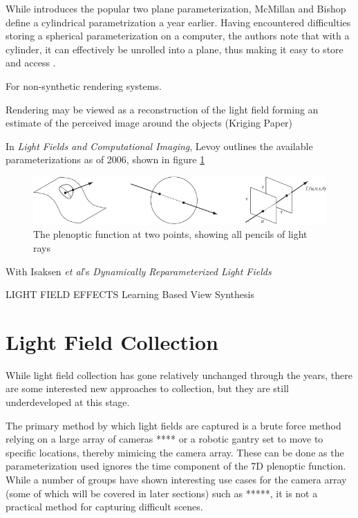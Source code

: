 \documentclass[12pt]{report}
\begin{document}
While \cite{Levoy96} introduces the popular two plane parameterization, McMillan and Bishop define a cylindrical parametrization a year earlier. Having encountered difficulties storing a spherical parameterization on a computer, the authors note that with a cylinder, it can effectively be unrolled into a plane, thus making it easy to store and access \cite{McMillan95}.

For non-synthetic rendering systems.

Rendering may be viewed as a reconstruction
of the light field forming an estimate of the
perceived image around the objects
(Kriging Paper)

In \emph{Light Fields and Computational Imaging}, Levoy outlines the available parameterizations as of 2006, shown in figure \ref{fig:parameterization_visual}
\begin{figure}[!ht]
	\centering
	\includegraphics[scale=0.75]{Light-field-parameterizations.png}
	\caption{The plenoptic function at two points, showing all pencils of light rays \cite{Adelson91}}
	\label{fig:parameterization_visual}
\end{figure}

With Isaksen \emph{et al}'s \emph{Dynamically Reparameterized Light Fields}

LIGHT FIELD EFFECTS
Learning Based View Synthesis


\section*{Light Field Collection}
While light field collection has gone relatively unchanged through the years, there are some interested new approaches to collection, but they are still underdeveloped at this stage. 

The primary method by which light fields are captured is a brute force method relying on a large array of cameras \cite{Ng06}**** or a robotic gantry set to move to specific locations, thereby mimicing the camera array. These can be done as the parameterization used ignores the time component of the 7D plenoptic function. While a number of groups have shown interesting use cases for the camera array (some of which will be covered in later sections) such as \cite{Ng06}*****, it is not a practical method for capturing difficult scenes.
\end{document}
